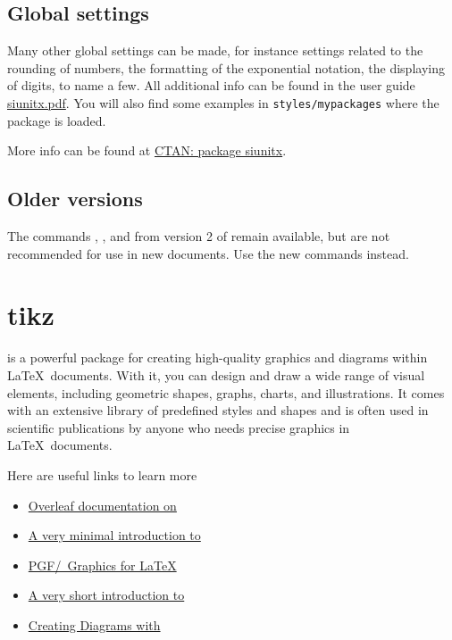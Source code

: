 \subsection{Global settings}\label{siunitxglobal}
Many other global settings can be made, for instance settings related to the rounding of numbers, the formatting of the exponential notation, the displaying of digits, to name a few. All additional info can be found in the user guide \href{https://mirror.lyrahosting.com/CTAN/macros/latex/contrib/siunitx/siunitx.pdf}{siunitx.pdf}. You will also find some examples in \verb|styles/mypackages| where the package  is loaded.

More info can be found at \href{https://ctan.org/pkg/siunitx?lang=en}{CTAN: package siunitx}.

\subsection{Older versions}
The commands , ,  and  from version 2 of  remain available, but are not recommended for use in new documents. Use the new commands instead.

\section{tikz}\label{sec:tikz}
\pkg{\TikZ} is a powerful package for creating high-quality graphics and diagrams within \LaTeX\ documents. With it, you can design and draw a wide range of visual elements, including geometric shapes, graphs, charts, and illustrations. It comes with an extensive library of predefined styles and shapes and is often used in scientific publications by anyone who needs precise graphics in \LaTeX\ documents.

Here are useful links to learn more
\begin{itemize}
    \item \href{https://www.overleaf.com/learn/latex/TikZ_package}{Overleaf documentation on \TikZ}
    \item \href{https://cremeronline.com/LaTeX/minimaltikz.pdf}{A very minimal introduction to \TikZ}
    \item \href{https://www.math.uni-leipzig.de/~hellmund/LaTeX/pgf-tut.pdf}{PGF/\TikZ\  Graphics for \LaTeX} 
    \item \href{http://siam.cs.kuleuven.be/sites/siam.cs.kuleuven.be/files/events/tikz_workshop/tikz_introduction.pdf}{A very short introduction to \TikZ} 
    \item \href{http://csweb.ucc.ie/~dongen/LAF/TikZ.pdf}{Creating Diagrams with \TikZ}
\end{itemize}

